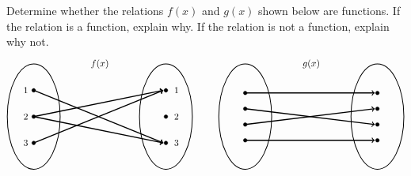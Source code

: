 \documentclass[12pt,letterpaper]{exam}
\begin{document}
\examtitle
{} 
\scores
\newpage

\begin{questions}

\newpage
\question[10] Determine whether the relations $f(x)$ and $g(x)$ shown below are functions. If the relation is a function, explain why. If the relation is not a function, explain why not. 
	\[
	\begin{tikzpicture}
	\node at (2.5,2) {$f(x)$};
	\draw[line width=0.03cm] (0,0) circle (1 and 2);
	\draw[line width=0.03cm] (5,0) circle (1 and 2);
	
	\draw[fill=black] (0,1) circle (0.07);
	\draw[fill=black] (0,0) circle (0.07);
	\draw[fill=black] (0,-1) circle (0.07);
	
	\draw[fill=black] (5,1) circle (0.07);
	\draw[fill=black] (5,0) circle (0.07);
	\draw[fill=black] (5,-1) circle (0.07);
	
	\draw[line width=0.04cm,->] (0,1) -- (4.9,-1);
	\draw[line width=0.04cm,->] (0,0) -- (4.9,1);
	\draw[line width=0.04cm,->] (0,0) -- (4.9,-1);
	\draw[line width=0.04cm,->] (0,-1) -- (4.9,1);
	
	\node at (-0.3,1) {$1$};
	\node at (-0.3,0) {$2$};
	\node at (-0.3,-1) {$3$};
	
	\node at (5.4,1) {$1$};
	\node at (5.4,0) {$2$};
	\node at (5.4,-1) {$3$};
	
	\tikzset{shift={(8,0)}}
	\node at (2.5,2) {$g(x)$};
	\draw[line width=0.03cm] (0,0) circle (1 and 2);
	\draw[line width=0.03cm] (5,0) circle (1 and 2);
	
	\draw[fill=black] (0,0.9) circle (0.07);
	\draw[fill=black] (0,0.3) circle (0.07);
	\draw[fill=black] (0,-0.3) circle (0.07);
	\draw[fill=black] (0,-0.9) circle (0.07);
	
	\draw[fill=black] (5,0.9) circle (0.07);
	\draw[fill=black] (5,0.3) circle (0.07);
	\draw[fill=black] (5,-0.3) circle (0.07);
	\draw[fill=black] (5,-0.9) circle (0.07);
	
	\draw[line width=0.04cm,->] (0,0.9) -- (4.9,0.9);
	\draw[line width=0.04cm,->] (0,0.3) -- (4.9,-0.3);
	\draw[line width=0.04cm,->] (0,-0.3) -- (4.9,0.3);
	\draw[line width=0.04cm,->] (0,-0.9) -- (4.9,-0.9);


\end{tikzpicture}\]
\end{questions}
\end{document}
